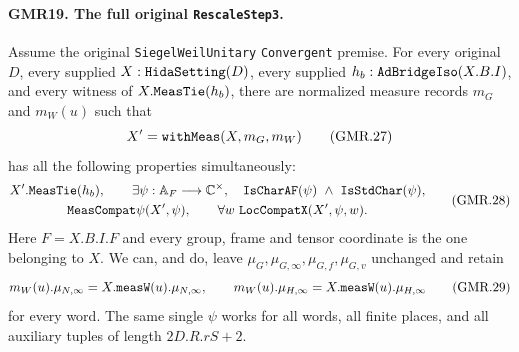 \documentclass[11pt,a4paper]{article}
\numberwithin{equation}{section}
\theoremstyle{remark}\newtheorem{remark}[theorem]{Remark}
\begin{document}
\paragraph{GMR19. The full original \texttt{Rescale\allowbreak Step3}.}
\label{claim:GMR19}
Assume the original \texttt{Siegel\allowbreak Weil\allowbreak Unitary}\allowbreak
\texttt{Convergent} premise.
For every original $D$, every supplied $X:\texttt{Hida\allowbreak Setting}(D)$,
every supplied $h_b:\texttt{Ad\allowbreak Bridge\allowbreak Iso}(X.B.I)$, and every witness
of $X.\texttt{Meas\allowbreak Tie}(h_b)$, there are normalized measure records
$m_G$ and $m_W(u)$ such that
\[
 X'=\texttt{with\allowbreak Meas}(X,m_G,m_W)
 \tag{GMR.27}
\]
has all the following properties simultaneously:
\[
\begin{gathered}
 X'.\texttt{Meas\allowbreak Tie}(h_b),\qquad
 \exists\psi:\mathbb A_F\longrightarrow\mathbb C^\times,\quad
 \texttt{Is\allowbreak Char\allowbreak AF}(\psi)\ \wedge\ \texttt{Is\allowbreak Std\allowbreak Char}(\psi),\\
 \texttt{MeasCompat\ensuremath{\psi}}(X',\psi),\qquad
 \forall w\ \texttt{Loc\allowbreak Compat\allowbreak X}(X',\psi,w).
\end{gathered}
 \tag{GMR.28}
\]
Here $F=X.B.I.F$ and every group, frame and tensor coordinate is the
one belonging to $X$.  We can, and do, leave
$\mu_G,\mu_{G,\infty},\mu_{G,f},\mu_{G,v}$ unchanged and retain
\[
 m_W(u).\mu_{N,\infty}=X.\texttt{meas\allowbreak W}(u).\mu_{N,\infty},\qquad
 m_W(u).\mu_{H,\infty}=X.\texttt{meas\allowbreak W}(u).\mu_{H,\infty}
 \tag{GMR.29}
\]
for every word.  The same single $\psi$ works for all words, all
finite places, and all auxiliary tuples of length $2D.R.rS+2$.
\end{document}
